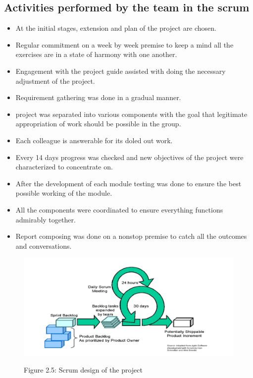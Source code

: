 \documentclass[oneside,12pt]{Classes/VTU}
\begin{document}
    	\subsection{Activities performed by the team in the scrum}
    	\begin{itemize}
    		\item At the initial stages, extension and plan of the project are chosen. 
    		\item Regular commitment on a week by week premise to keep a mind all the exercises are in a state of harmony with one another. 		
    		\item Engagement with the project guide assisted with doing the necessary adjustment of the project.    		
    		\item Requirement gathering was done in a gradual manner.     		
    		\item project was separated into various components with the goal that legitimate appropriation of work should be possible in the group. 
    		\item Each colleague is answerable for its doled out work.    		
    		\item Every 14 days progress was checked and new objectives of the project were characterized to concentrate on.    		
    		\item After the development of each module testing was done to ensure the best possible working of the module.    		
    		\item All the components were coordinated to ensure everything functions admirably together.    		
    		\item Report composing was done on a nonstop premise to catch all the outcomes and conversations.
    	\end{itemize}
    	
    	
    	\begin{figure}
    		\begin{center}
    			\includegraphics[scale=0.5]{images/animesh_chotu.png}
    		\end{center}
    		
    		\begin{center}
    			Figure 2.5: Scrum design of the project
    		\end{center}
    	\end{figure}
\end{document}
